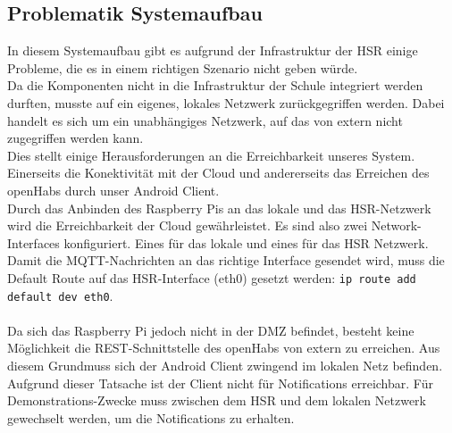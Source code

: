 \subsection{Problematik Systemaufbau}
In diesem Systemaufbau gibt es aufgrund der Infrastruktur der HSR einige Probleme, die es in einem richtigen Szenario nicht geben würde. \\
Da die Komponenten nicht in die Infrastruktur der Schule integriert werden durften, musste auf ein eigenes, lokales Netzwerk zurückgegriffen werden. Dabei handelt es sich um ein unabhängiges Netzwerk, auf das von extern nicht zugegriffen werden kann. \\
Dies stellt einige Herausforderungen an die Erreichbarkeit unseres System. Einerseits die Konektivität mit der Cloud und andererseits das Erreichen des openHabs durch unser Android Client. \\
Durch das Anbinden des Raspberry Pis an das lokale und das HSR-Netzwerk wird die Erreichbarkeit der Cloud gewährleistet. Es sind also zwei Network-Interfaces konfiguriert. Eines für das lokale und eines für das HSR Netzwerk. Damit die MQTT-Nachrichten an das richtige Interface gesendet wird, muss die Default Route auf das HSR-Interface (eth0) gesetzt werden: \lstinline!ip route add default dev eth0!. \\\\
Da sich das Raspberry Pi jedoch nicht in der DMZ befindet, besteht keine Möglichkeit die REST-Schnittstelle des openHabs von extern zu erreichen. Aus diesem Grundmuss sich der Android Client zwingend im lokalen Netz befinden. \\
Aufgrund dieser Tatsache ist der Client nicht für Notifications erreichbar. Für Demonstrations-Zwecke muss zwischen dem HSR und dem lokalen Netzwerk gewechselt werden, um die Notifications zu erhalten.





